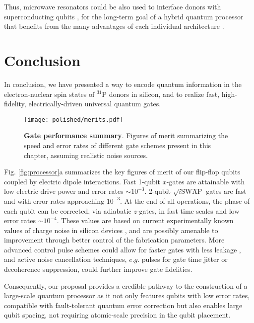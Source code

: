 Thus, microwave resonators could be also used to interface donors with superconducting qubits \cite{Barends2014,Devoret2013}, for the long-term goal of a hybrid quantum processor that benefits from the many advantages of each individual architecture \cite{Xiang2012}.

\section{Conclusion}
In conclusion, we have presented a way to encode quantum information in the electron-nuclear spin states of $^{31}$P donors in silicon, and to realize fast, high-fidelity, electrically-driven universal quantum gates. 

\begin{figure}
	\centering
	\texttt{[image: polished/merits.pdf]}
	\caption[Gate performance summary]{\textbf{Gate performance summary}. Figures of merit summarizing the speed and error rates of different gate schemes present in this chapter, assuming realistic noise sources. }
	\label{fig:performance}
\end{figure}


Fig. \ref{fig:processor}a summarizes the key figures of merit of our flip-flop qubits coupled by electric dipole interactions. Fast 1-qubit $x$-gates are attainable with low electric drive power and error rates $\sim10^{-3}$. 2-qubit $\sqrt{i\mathrm{SWAP}}$ gates are fast and with error rates approaching $10^{-3}$. At the end of all operations, the phase of each qubit can be corrected, via adiabatic $z$-gates, in fast time scales and low error rates $\sim10^{-4}$. These values are based on current experimentally known values of charge noise in silicon devices \cite{Freeman2017}, and are possibly amenable to improvement through better control of the fabrication parameters. More advanced control pulse schemes could allow for faster gates with less leakage \cite{Motzoi2009,Ghosh2017,Werschnik2007}, and active noise cancellation techniques, $e.g.$ pulses for gate time jitter \cite{Hill2007} or decoherence \cite{VanDerSar2012} suppression, could further improve gate fidelities. 

Consequently, our proposal provides a credible pathway to the construction of a large-scale quantum processor as it not only features qubits with low error rates, compatible with fault-tolerant quantum error correction but also enables large qubit spacing, not requiring atomic-scale precision in the qubit placement.
